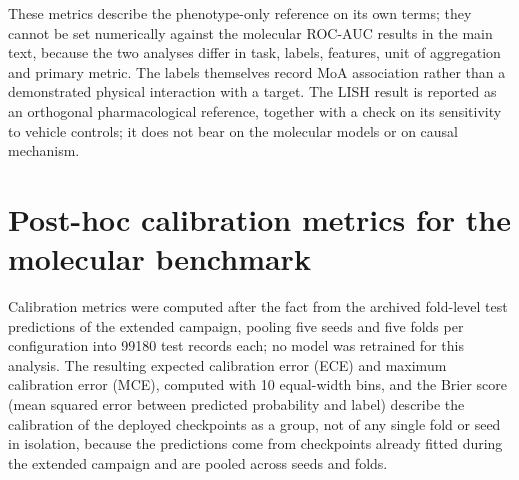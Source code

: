 \documentclass[11pt,a4paper]{article}
\begin{document}
These metrics describe the phenotype-only reference on its own terms; they cannot be set numerically against the molecular ROC-AUC results in the main text, because the two analyses differ in task, labels, features, unit of aggregation and primary metric. The labels themselves record MoA association rather than a demonstrated physical interaction with a target. The LISH result is reported as an orthogonal pharmacological reference, together with a check on its sensitivity to vehicle controls; it does not bear on the molecular models or on causal mechanism.

\section{Post-hoc calibration metrics for the molecular benchmark}
\label{sec:calibration_si}

Calibration metrics were computed after the fact from the archived fold-level test predictions of the extended campaign, pooling five seeds and five folds per configuration into \num{99180} test records each; no model was retrained for this analysis. The resulting expected calibration error (ECE) and maximum calibration error (MCE), computed with \num{10} equal-width bins, and the Brier score (mean squared error between predicted probability and label) describe the calibration of the deployed checkpoints as a group, not of any single fold or seed in isolation, because the predictions come from checkpoints already fitted during the extended campaign and are pooled across seeds and folds.
\end{document}
